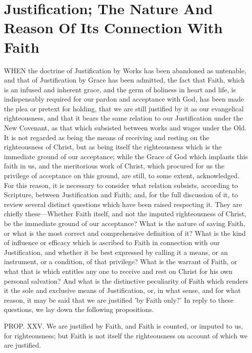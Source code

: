 \documentclass[
]{book}
\begin{document}
\hypertarget{justification-the-nature-and-reason-of-its-connection-with-faith}{%
\chapter{Justification; The Nature And Reason Of Its Connection With Faith}\label{justification-the-nature-and-reason-of-its-connection-with-faith}}

WHEN the doctrine of Justification by Works has been abandoned as untenable, and that of Justification by Grace has been admitted, the fact that Faith, which is an infused and inherent grace, and the germ of holiness in heart and life, is indispensably required for our pardon and acceptance with God, has been made the plea or pretext for holding, that we are still justified by it as our evangelical righteousness, and that it bears the same relation to our Justification under the New Covenant, as that which subsisted between works and wages under the Old. It is not regarded as being the means of receiving and resting on the righteousness of Christ, but as being itself the righteousness which is the immediate ground of our acceptance; while the Grace of God which implants this faith in us, and the meritorious work of Christ, which procured for us the privilege of acceptance on this ground, are still, to some extent, acknowledged. For this reason, it is necessary to consider what relation subsists, according to Scripture, between Justification and Faith; and, for the full discussion of it, to review several distinct questions which have been raised respecting it. They are chiefly these---Whether Faith itself, and not the imputed righteousness of Christ, be the immediate ground of our acceptance? What is the nature of saving Faith, or what is the most correct and comprehensive definition of it? What is the kind of influence or efficacy which is ascribed to Faith in connection with our Justification, and whether it be best expressed by calling it a means, or an instrument, or a condition, of that privilege? What is the warrant of Faith, or what that is which entitles any one to receive and rest on Christ for his own personal salvation? And what is the distinctive peculiarity of Faith which renders it the sole and exclusive means of Justification, or, in what sense, and for what reason, it may be said that we are justified 'by Faith only?' In reply to these questions, we lay down the following propositions.

PROP. XXV. We are justified by Faith, and Faith is counted, or imputed to us, for righteousness; but Faith is not itself the righteousness on account of which we are justified.
\end{document}
